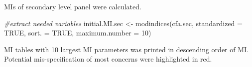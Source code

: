 \documentclass[
]{article}
\newenvironment{Shaded}{\begin{snugshade}}{\end{snugshade}}
\newcommand{\AttributeTok}[1]{\textcolor[rgb]{0.77,0.63,0.00}{#1}}
\newcommand{\CommentTok}[1]{\textcolor[rgb]{0.56,0.35,0.01}{\textit{#1}}}
\newcommand{\ConstantTok}[1]{\textcolor[rgb]{0.00,0.00,0.00}{#1}}
\newcommand{\DecValTok}[1]{\textcolor[rgb]{0.00,0.00,0.81}{#1}}
\newcommand{\FunctionTok}[1]{\textcolor[rgb]{0.00,0.00,0.00}{#1}}
\newcommand{\NormalTok}[1]{#1}
\newcommand{\OtherTok}[1]{\textcolor[rgb]{0.56,0.35,0.01}{#1}}
\begin{document}
MIs of secondary level panel were calculated.

\begin{Shaded}
\begin{Highlighting}[]
\CommentTok{\#extract needed variables}
\NormalTok{initial.MI.sec }\OtherTok{\textless{}{-}} 
  \FunctionTok{modindices}\NormalTok{(cfa.sec,}
             \AttributeTok{standardized =} \ConstantTok{TRUE}\NormalTok{,}
             \AttributeTok{sort. =} \ConstantTok{TRUE}\NormalTok{,}
             \AttributeTok{maximum.number =} \DecValTok{10}\NormalTok{)}
\end{Highlighting}
\end{Shaded}

MI tables with 10 largest MI parameters was printed in descending order of MI. Potential mis-specification of most concerns were highlighted in red.
\end{document}
